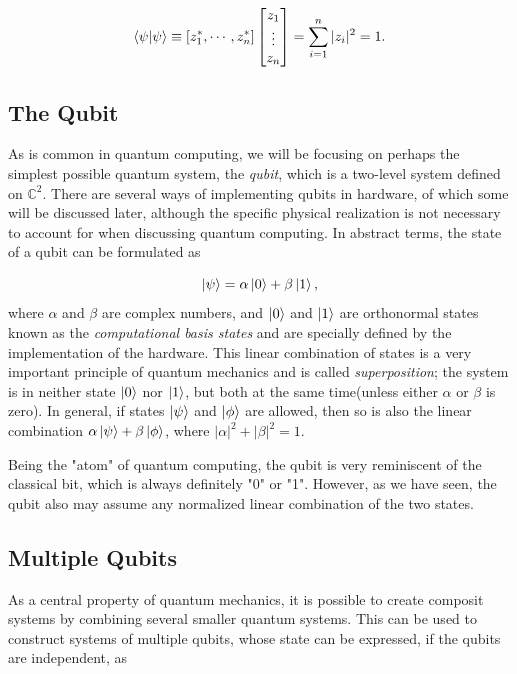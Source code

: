 \begin{equation}
    \braket{\psi}{\psi} \equiv [z_1^*, \cdots, z_n^*] 
    \begin{bmatrix}
        z_{1} \\
        \vdots \\
        z_{n}
    \end{bmatrix}
    = \sum_{i=1}^{n} |z_i|^2 = 1.
\end{equation}

\subsection{The Qubit}\label{sec:TheQubit}
As is common in quantum computing, we will be focusing on perhaps the simplest possible quantum system, the \emph{qubit}, which is a two-level system defined on $\mathbb{C}^2$.  There are several ways of implementing qubits in hardware, of which some will be discussed later, although  the specific physical realization is not necessary to account for when discussing quantum computing. In abstract terms, the state of a qubit can be formulated as

\begin{equation}
\ket{\psi} = \alpha \ket{0} + \beta \ket{1},
\end{equation}
where $\alpha$ and $\beta$ are complex numbers, and $\ket{0}$ and $\ket{1}$ are orthonormal states known as the \emph{computational basis states} and are specially defined by the implementation of the hardware. This linear combination of states is a very important principle of quantum mechanics and is called \emph{superposition}; the system is in neither state $\ket{0}$ nor $\ket{1}$, but both at the same time(unless either $\alpha$ or $\beta$ is zero). In general, if states $\ket{\psi}$ and $\ket{\phi}$ are allowed, then so is also the linear combination $\alpha \ket{\psi} + \beta \ket{\phi}$, where $|\alpha|^2 + |\beta|^2 = 1$.

Being the "atom" of quantum computing, the qubit is very reminiscent of the classical bit, which is always definitely "0" or "1". However, as we have seen, the qubit also may assume any normalized linear combination of the two states.
\subsection{Multiple Qubits}\label{sec:Multiple Qubits}
As a central property of quantum mechanics, it is possible to create composit systems by combining several smaller quantum systems. This can be used to construct systems of multiple qubits, whose state can be expressed, if the qubits are independent, as

